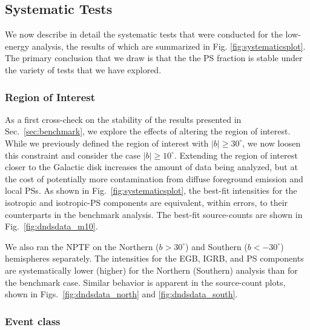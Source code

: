 \subsection{Systematic Tests}
\label{app:systematics}

We now describe in detail the systematic tests that were conducted for the low-energy analysis, the results of which are summarized in Fig. \ref{fig:systematicsplot}.  The primary conclusion that we draw is that the the PS fraction is stable under the variety of tests that we have explored.  

\subsubsection{Region of Interest}

As a first cross-check on the stability of the results presented in Sec.~\ref{sec:benchmark}, we explore the effects of altering the region of interest.  While we previously defined the region of interest with $|b| \geq 30^\circ$, we now loosen this constraint and consider the case $|b| \geq 10^\circ$.  Extending the region of interest closer to the Galactic disk increases the amount of data being analyzed, but at the cost of potentially more contamination from diffuse foreground emission and local PSs.  As shown in Fig.~\ref{fig:systematicsplot}, the best-fit intensities for the isotropic and isotropic-PS components are equivalent, within errors, to their counterparts in the benchmark analysis. The best-fit source-counts are shown in Fig.~\ref{fig:dndsdata_m10}.

We also ran the NPTF on the Northern ($b > 30^\circ$) and Southern ($b < -30^\circ$) hemispheres separately.  The intensities for the EGB, IGRB, and PS components are systematically lower (higher) for the Northern (Southern) analysis than for the benchmark case.  Similar behavior is apparent in the source-count plots, shown in Figs.~\ref{fig:dndsdata_north} and \ref{fig:dndsdata_south}.  



\subsubsection{Event class}

